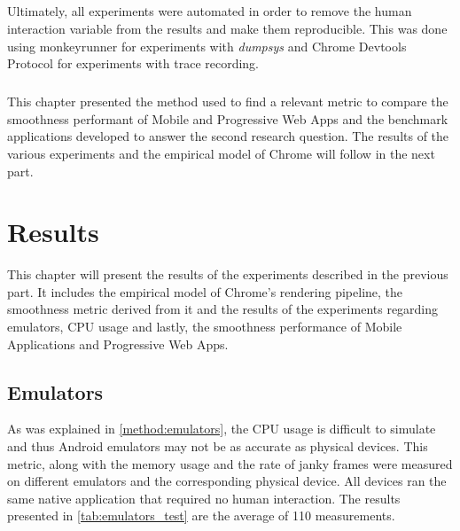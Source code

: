 \documentclass{kththesis}
\begin{document}
\paragraph{}
Ultimately, all experiments were automated in order to remove the human interaction variable from the results and make them reproducible. This was done using monkeyrunner for experiments with \textit{dumpsys} and Chrome Devtools Protocol for experiments with trace recording.

\paragraph{}
This chapter presented the method used to find a relevant metric to compare the smoothness performant of Mobile and Progressive Web Apps and the benchmark applications developed to answer the second research question. The results of the various experiments and the empirical model of Chrome will follow in the next part.

\chapter{Results}

This chapter will present the results of the experiments described in the previous part. It includes the empirical model of Chrome's rendering pipeline, the smoothness metric derived from it and the results of the experiments regarding emulators, CPU usage and lastly, the smoothness performance of Mobile Applications and Progressive Web Apps.

\section{Emulators}

As was explained in \autoref{method:emulators}, the CPU usage is difficult to simulate and thus Android emulators may not be as accurate as physical devices. This metric, along with the memory usage and the rate of janky frames were measured on different emulators and the corresponding physical device. All devices ran the same native application that required no human interaction. The results presented in \autoref{tab:emulators_test} are the average of 110 measurements.
\end{document}

